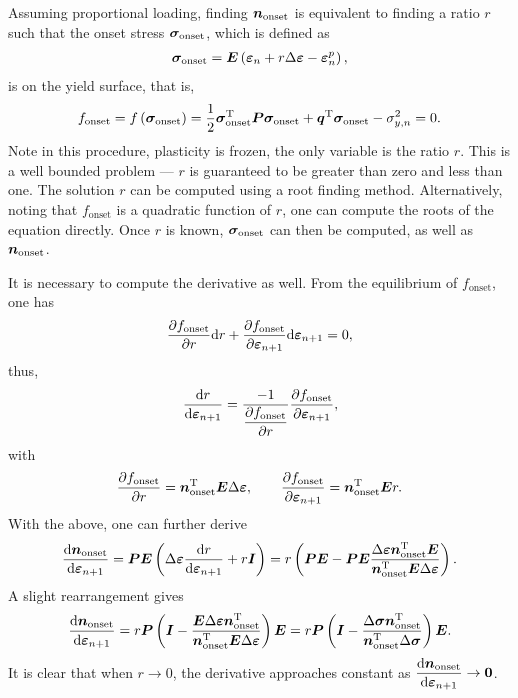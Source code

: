 Assuming proportional loading, finding $\bm{n}_\text{onset}$ is equivalent to finding a ratio $r$ such that the onset stress $\bm{\sigma}_\text{onset}$, which is defined as
\begin{gather}
    \bm{\sigma}_\text{onset}=\bm{E}\left(\bm{\varepsilon}_n+r\Delta\bm{\varepsilon}-\bm{\varepsilon}_n^p\right),
\end{gather}
is on the yield surface, that is,
\begin{gather}
    f_\text{onset}=f\left(\bm{\sigma}_\text{onset}\right)=\dfrac{1}{2}\bm{\sigma}_\text{onset}^{\mathrm{T}}\bm{P}\bm{\sigma}_\text{onset}+\bm{q}^{\mathrm{T}}\bm{\sigma}_\text{onset}-\sigma_{y,n}^2=0.
\end{gather}
Note in this procedure, plasticity is frozen, the only variable is the ratio $r$.
This is a well bounded problem --- $r$ is guaranteed to be greater than zero and less than one.
The solution $r$ can be computed using a root finding method.
Alternatively, noting that $f_\text{onset}$ is a quadratic function of $r$, one can compute the roots of the equation directly.
Once $r$ is known, $\bm{\sigma}_\text{onset}$ can then be computed, as well as $\bm{n}_\text{onset}$.

It is necessary to compute the derivative as well.
From the equilibrium of $f_\text{onset}$, one has
\begin{gather}
    \dfrac{\partial{f_\text{onset}}}{\partial{r}}\mathrm{d}r+\dfrac{\partial{f_\text{onset}}}{\partial{\bm{\varepsilon}_{n+1}}}\mathrm{d}\bm{\varepsilon}_{n+1}=0,
\end{gather}
thus,
\begin{gather}
    \dfrac{\mathrm{d}r}{\mathrm{d}\bm{\varepsilon}_{n+1}}=\dfrac{-1}{\dfrac{\partial{f_\text{onset}}}{\partial{r}}}\dfrac{\partial{f_\text{onset}}}{\partial{\bm{\varepsilon}_{n+1}}},
\end{gather}
with
\begin{gather}
    \dfrac{\partial{f_\text{onset}}}{\partial{r}}=\bm{n}_\text{onset}^{\mathrm{T}}\bm{E}\Delta\bm{\varepsilon},\qquad
    \dfrac{\partial{f_\text{onset}}}{\partial{\bm{\varepsilon}_{n+1}}}=\bm{n}_\text{onset}^{\mathrm{T}}\bm{E}r.
\end{gather}
With the above, one can further derive
\begin{gather}
    \dfrac{\mathrm{d}\bm{n}_\text{onset}}{\mathrm{d}\bm{\varepsilon}_{n+1}}=\bm{PE}\left(\Delta\bm{\varepsilon}\dfrac{\mathrm{d}r}{\mathrm{d}\bm{\varepsilon}_{n+1}}+r\bm{I}\right)=r\left(\bm{PE}-\bm{PE}\dfrac{\Delta\bm{\varepsilon}\bm{n}_\text{onset}^{\mathrm{T}}\bm{E}}{\bm{n}_\text{onset}^{\mathrm{T}}\bm{E}\Delta\bm{\varepsilon}}\right).
\end{gather}
A slight rearrangement gives
\begin{gather}
    \dfrac{\mathrm{d}\bm{n}_\text{onset}}{\mathrm{d}\bm{\varepsilon}_{n+1}}=r\bm{P}\left(\bm{I}-\dfrac{\bm{E}\Delta\bm{\varepsilon}\bm{n}_\text{onset}^{\mathrm{T}}}{\bm{n}_\text{onset}^{\mathrm{T}}\bm{E}\Delta\bm{\varepsilon}}\right)\bm{E}=r\bm{P}\left(\bm{I}-\dfrac{\Delta\bm{\sigma}\bm{n}_\text{onset}^{\mathrm{T}}}{\bm{n}_\text{onset}^{\mathrm{T}}\Delta\bm{\sigma}}\right)\bm{E}.
\end{gather}
It is clear that when $r\rightarrow0$, the derivative approaches constant as $\dfrac{\mathrm{d}\bm{n}_\text{onset}}{\mathrm{d}\bm{\varepsilon}_{n+1}}\rightarrow\bm{0}$.

